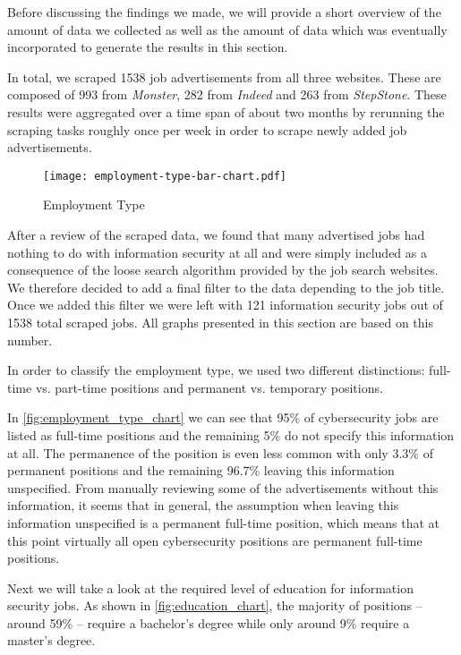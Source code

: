 \documentclass[runningheads]{llncs}
\begin{document}
Before discussing the findings we made, we will provide a short overview of the amount of data we collected as well as the amount of data which was eventually incorporated to generate the results in this section.


In total, we scraped 1538 job advertisements from all three websites. These are composed of 993 from \textit{Monster}, 282 from \textit{Indeed} and 263 from \textit{StepStone}. These results were aggregated over a time span of about two months by rerunning the scraping tasks roughly once per week in order to scrape newly added job advertisements.

\begin{figure}[H]
	\centering
  \texttt{[image: employment-type-bar-chart.pdf]}
	\caption{Employment Type}
	\label{fig:employment_type_chart}
\end{figure}

After a review of the scraped data, we found that many advertised jobs had nothing to do with information security at all and were simply included as a consequence of the loose search algorithm provided by the job search websites. We therefore decided to add a final filter to the data depending to the job title. Once we added this filter we were left with 121 information security jobs out of 1538 total scraped jobs. All graphs presented in this section are based on this number.

In order to classify the employment type, we used two different distinctions: full-time vs. part-time positions and permanent vs. temporary positions.

In \autoref{fig:employment_type_chart} we can see that 95\% of cybersecurity jobs are listed as full-time positions and the remaining 5\% do not specify this information at all. The permanence of the position is even less common with only 3.3\% of permanent positions and the remaining 96.7\% leaving this information unspecified. From manually reviewing some of the advertisements without this information, it seems that in general, the assumption when leaving this information unspecified is a permanent full-time position, which means that at this point virtually all open cybersecurity positions are permanent full-time positions.

Next we will take a look at the required level of education for information security jobs. As shown in \autoref{fig:education_chart}, the majority of positions -- around 59\% -- require a bachelor's degree while only around 9\% require a master's degree.
\end{document}
